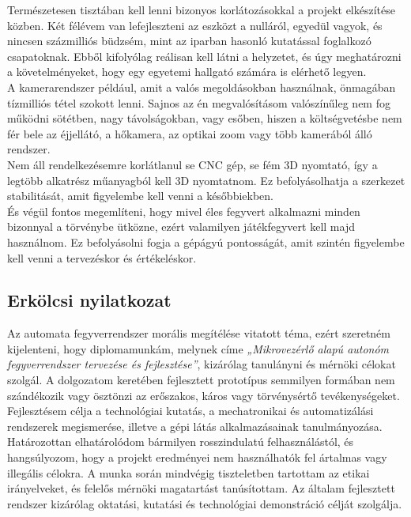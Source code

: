 \documentclass[12pt,a4paper]{article}
\begin{document}
Természetesen tisztában kell lenni bizonyos korlátozásokkal a projekt elkészítése közben. Két félévem van lefejleszteni az eszközt a nulláról, egyedül vagyok, és nincsen százmilliós büdzsém, mint az iparban hasonló kutatással foglalkozó csapatoknak. Ebből kifolyólag reálisan kell látni a helyzetet, és úgy meghatározni a követelményeket, hogy egy egyetemi hallgató számára is elérhető legyen. \\

A kamerarendszer például, amit a valós megoldásokban használnak, önmagában tízmilliós tétel szokott lenni. Sajnos az én megvalósításom valószínűleg nem fog működni sötétben, nagy távolságokban, vagy esőben, hiszen a költségvetésbe nem fér bele az éjjellátó, a hőkamera, az optikai zoom vagy több kamerából álló rendszer.\\

Nem áll rendelkezésemre korlátlanul se CNC gép, se fém 3D nyomtató, így a legtöbb alkatrész műanyagból kell 3D nyomtatnom. Ez befolyásolhatja a szerkezet stabilitását, amit figyelembe kell venni a későbbiekben.\\

És végül fontos megemlíteni, hogy mivel éles fegyvert alkalmazni minden bizonnyal a törvénybe ütközne, ezért valamilyen játékfegyvert kell majd használnom. Ez befolyásolni fogja a gépágyú pontosságát, amit szintén figyelembe kell venni a tervezéskor és értékeléskor.\\


\pagebreak

\subsection{Erkölcsi nyilatkozat}
Az automata fegyverrendszer morális megítélése vitatott téma, ezért szeretném kijelenteni, hogy diplomamunkám, melynek címe \textsl{„Mikrovezérlő alapú autonóm fegyverrendszer tervezése és fejlesztése”}, kizárólag tanulányni és mérnöki célokat szolgál. A dolgozatom keretében fejlesztett prototípus semmilyen formában nem szándékozik vagy ösztönzi az erőszakos, káros vagy törvénysértő tevékenységeket. Fejlesztésem célja a technológiai kutatás, a mechatronikai és automatizálási rendszerek megismerése, illetve a gépi látás alkalmazásainak tanulmányozása. \\

Határozottan elhatárolódom bármilyen rosszindulatú felhasználástól, és hangsúlyozom, hogy a projekt eredményei nem használhatók fel ártalmas vagy illegális célokra. A munka során mindvégig tiszteletben tartottam az etikai irányelveket, és felelős mérnöki magatartást tanúsítottam. Az általam fejlesztett rendszer kizárólag oktatási, kutatási és technológiai demonstráció célját szolgálja.
\end{document}
